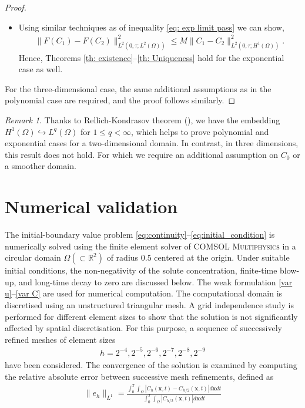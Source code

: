 \documentclass[final,3p,times]{elsarticle}
\theoremstyle{plain}
\theoremstyle{remark}
\newtheorem{remark}{Remark}
\theoremstyle{plain}
\theoremstyle{remark}
\begin{document}
\begin{proof}
\begin{itemize}
        \item Using similar techniques as of inequality \eqref{eq: exp limit pass} we can show,
 \begin{align}
     \|F\left(C_1\right) - F\left(C_2\right)\|^2_{L^2\left(0,\tau;L^2(\Omega)\right)} \le M \|C_1 - C_2\|^2_{L^2\left(0,\tau;H^1(\Omega)\right)}.
 \end{align} 
    Hence, Theorems \ref{th: existence}--\ref{th: Uniqueness} hold for the exponential case as well. 
\end{itemize}

For the three-dimensional case, the same additional assumptions as in the polynomial case are required, and the proof follows similarly.
\end{proof} 

\begin{remark}
   Thanks to Rellich-Kondrasov theorem (\emph{\citep[Theorem 2.6.3]{kesavan2015topics}}), we have the embedding $H^1(\Omega)\hookrightarrow L^q(\Omega)$ for $1\leq q <\infty$, which helps to prove polynomial and exponential cases for a two-dimensional domain. In contrast, in three dimensions, this result does not hold. For which we require an additional assumption on $C_0$ or a smoother domain. 
\end{remark}

\section{Numerical validation} \label{sec:numerical}

The initial-boundary value problem \eqref{eq:continuity}--\eqref{eq:initial_condition} is numerically solved using the finite element solver of COMSOL \textsc{Multiphysics} in a circular domain $\Omega (\subset \mathds R^2)$ of radius $0.5$ centered at the origin. Under suitable initial conditions, the non-negativity of the solute concentration, finite-time blow-up, and long-time decay to zero are discussed below. The weak formulation \eqref{var u}--\eqref{var C} are used for numerical computation. The computational domain is discretised using an unstructured triangular mesh. A grid independence study is performed for different element sizes to show that the solution is not significantly affected by spatial discretisation. For this purpose, a sequence of successively refined  meshes of element sizes 
\begin{align*}
h=2^{-4},2^{-5},2^{-6},2^{-7},2^{-8},2^{-9}   
\end{align*} 
have been considered. The convergence of the solution is examined by computing the relative absolute error between successive mesh refinements, defined as
\begin{align}
    \| e_h \|_{L^1} = \frac{\int_0^T\int_\Omega\left| C_{h}(\mathbf x,t) - C_{h/2}(\mathbf x,t)\right|d\mathbf xdt}{\int_0^T\int_\Omega\left|C_{h/2}(\mathbf x,t)\right|d\mathbf xdt} 
\end{align}
\end{document}
